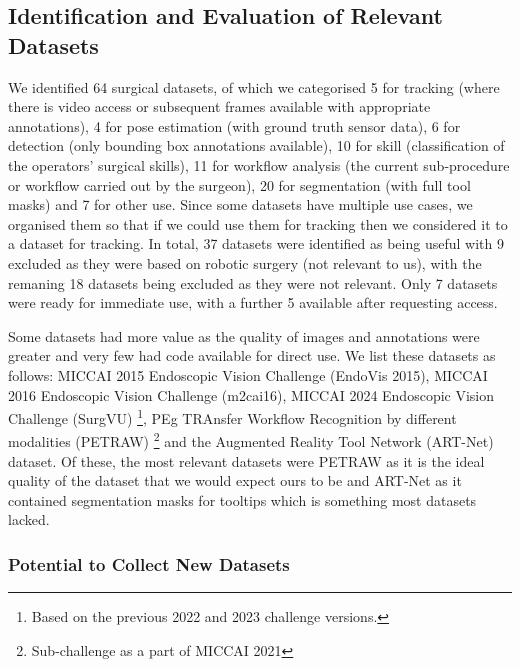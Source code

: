 \subsection{Identification and Evaluation of Relevant Datasets}

We identified 64 surgical datasets, of which we categorised 5 for tracking (where there is video access or subsequent frames available with appropriate annotations), 4 for pose estimation (with ground truth sensor data), 6 for detection (only bounding box annotations available), 10 for skill (classification of the operators' surgical skills), 11 for workflow analysis (the current sub-procedure or workflow carried out by the surgeon), 20 for segmentation (with full tool masks) and 7 for other use. Since some datasets have multiple use cases, we organised them so that if we could use them for tracking then we considered it to a dataset for tracking. In total, 37 datasets were identified as being useful with 9 excluded as they were based on robotic surgery (not relevant to us), with the remaning 18 datasets being excluded as they were not relevant. Only 7 datasets were ready for immediate use, with a further 5 available after requesting access.

Some datasets had more value as the quality of images and annotations were greater and very few had code available for direct use. We list these datasets as follows: MICCAI 2015 Endoscopic Vision Challenge (EndoVis 2015), MICCAI 2016 Endoscopic Vision Challenge (m2cai16), MICCAI 2024 Endoscopic Vision Challenge (SurgVU) \footnote{Based on the previous 2022 and 2023 challenge versions.}, PEg TRAnsfer Workflow Recognition by different modalities (PETRAW) \footnote{Sub-challenge as a part of MICCAI 2021} and the Augmented Reality Tool Network (ART-Net) dataset. Of these, the most relevant datasets were PETRAW as it is the ideal quality of the dataset that we would expect ours to be and ART-Net as it contained segmentation masks for tooltips which is something most datasets lacked.



\subsubsection{Potential to Collect New Datasets}

